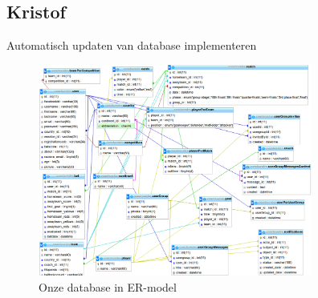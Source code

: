 \documentclass[11pt, a4paper]{article}
\begin{document}
\subsection{Kristof}
Automatisch updaten van database implementeren



\begin{figure}[ht!]
\centering
\includegraphics[width=90mm]{ER.png}
\caption{Onze database in ER-model}
\label{overflow}
\end{figure}
\end{document}
